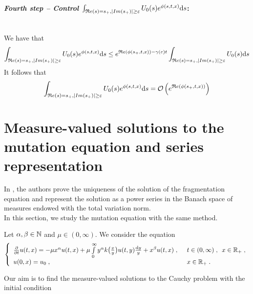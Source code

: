 \documentclass[11pt]{amsart}
\renewcommand{\Re}{\mathfrak{R}e}
\begin{document}
\medskip
\paragraph{\textit{Fourth step -- Control $\int_{\Re(s) = s_+, |Im(s_+)| \geq \varepsilon} U_0(s) e^{\phi(s, t, x)} \ds$}:}\mbox{}\\
We have that 
\begin{align*}
    \int_{\Re(s) = s_+, |Im(s_+)| \geq \varepsilon} U_0(s) e^{\phi(s, t, x)}
    \ds 
    &\leq  e^{\Re(\phi(s_+, t, x)) - \gamma(\varepsilon)t} \int_{\Re(s) = s_+, |Im(s_+)| \geq \varepsilon} U_0(s) \ds \\
\end{align*}
It follows that 
\begin{align*}
    \int_{\Re(s) = s_+, |Im(s_+)| \geq \varepsilon} U_0(s) e^{\phi(s, t, x)} 
    \ds = \Ocal \left( e^{\Re(\phi(s_+, t, x))} \right)
\end{align*}






\section{Measure-valued solutions to the mutation equation and series representation}
\label{s:measure_series_repr}

In \cite{doumic2021inverse}, the authors prove the uniqueness of the solution of the fragmentation equation and represent the solution as a power series in the Banach space of measures endowed with the total variation norm. \\

In this section, we study the mutation equation with the same method. 

Let $\alpha, \beta \in \mathbb{N}$ and $\mu \in (0, \infty)$.  
We consider the equation 
\begin{equation}\left\{
    \begin{array}{ll}
	\frac{\partial}{\partial t}u(t,x) = - \mu x^\alpha u(t,x) + \mu \int\limits_{0}^{\infty} y^\alpha k\big( \frac{x}{y}\big)u(t,y) \frac{\mathrm dy}{y} + x^\beta u(t,x) \; , \enspace
	& t \in (0, \infty) \; , \enspace x \in \mathbb{R}_+ \; ,
	\\ u(0, x) = u_0 \; , \enspace
	&  x \in \mathbb{R}_+
	\; .
    \end{array}
	\right.
    \label{eq:DET00.2.4}
\end{equation}

Our aim is to find the measure-valued solutions to the Cauchy problem with the initial condition
\end{document}
